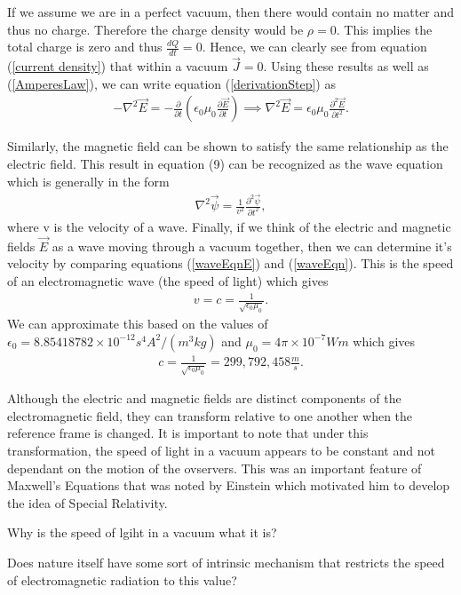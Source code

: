 If we assume we are in a perfect vacuum, then there would contain no matter and thus no charge. Therefore the charge density would be $\rho=0$. This implies the total charge is zero and thus $\frac{dQ}{dt}=0$. Hence, we can clearly see from equation (\ref{current density}) that within a vacuum $\vec{J}=0$. Using these results as well as (\ref{AmperesLaw}), we can write equation (\ref{derivationStep}) as
\begin{align}
	-\nabla^2\vec{E} = -\frac{\partial}{\partial t}\left(\epsilon_0\mu_0\frac{\partial \vec{E}}{\partial t}\right) \implies \nabla^2\vec{E} = \epsilon_0\mu_0\frac{\partial^2 \vec{E}}{\partial t^2}. \label{waveEqnE}
\end{align}

Similarly, the magnetic field can be shown to satisfy the same relationship as the electric field. This result in equation (9) can be recognized as the wave equation which is generally in the form
\begin{align}
	\nabla^2\vec{\psi} = \frac{1}{v^2}\frac{\partial^2 \vec{\psi}}{\partial t^2},\label{waveEqn}
\end{align}
where v is the velocity of a wave. Finally, if we think of the electric and magnetic fields $\vec{E}$ as a wave moving through a vacuum together, then we can determine it's velocity by comparing equations (\ref{waveEqnE}) and (\ref{waveEqn}). This is the speed of an electromagnetic wave (the speed of light) which gives
\begin{align}
	v=c=\frac{1}{\sqrt{\epsilon_0\mu_0}}.
\end{align}
We can approximate this based on the values of $\epsilon_0 = 8.85418782 \times 10^{-12}  s^4 A^2/(m^3 kg)$ and $\mu_0 =4\pi \times 10^{-7} Wm$ which gives
\begin{align}
	c=\frac{1}{\sqrt{\epsilon_0\mu_0}} = \boxed{299,792,458 \frac{m}{s}}.
\end{align}

\begin{interestnote}
Although the electric and magnetic fields are distinct components of the electromagnetic field, they can transform relative to one another when the reference frame is changed. It is important to note that under this transformation, the speed of light in a vacuum appears to be constant and not dependant on the motion of the ovservers. This was an important feature of Maxwell's Equations that was noted by Einstein which motivated him to develop the idea of Special Relativity. \label{speed of light constant in all reference frames note}
\end{interestnote}

\begin{questions}
	\item Why is the speed of lgiht in a vacuum what it is?
 	\item Does nature itself have some sort of intrinsic mechanism that restricts the speed of electromagnetic radiation to this value?
\end{questions}
